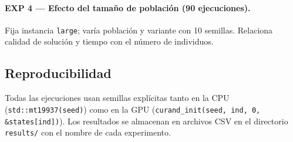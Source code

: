 \paragraph{EXP 4 — Efecto del tamaño de población (90 ejecuciones).}
Fija instancia \texttt{large}; varía población y variante con 10 semillas. Relaciona
calidad de solución y tiempo con el número de individuos.

\subsection{Reproducibilidad}

Todas las ejecuciones usan semillas explícitas tanto en la CPU
(\texttt{std::mt19937(seed)}) como en la GPU (\texttt{curand\_init(seed, ind, 0,
\&states[ind])}). Los resultados se almacenan en archivos CSV en el directorio
\texttt{results/} con el nombre de cada experimento.
